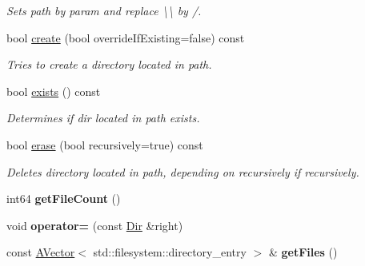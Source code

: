 \begin{DoxyCompactItemize}
\begin{DoxyCompactList}\small\item\em Sets path by param and replace \textbackslash{}\textbackslash{} by /. \end{DoxyCompactList}\item 
bool \mbox{\hyperlink{class_dir_a58485e06d15995822a108246d2b76b47}{create}} (bool override\+If\+Existing=false) const
\begin{DoxyCompactList}\small\item\em Tries to create a directory located in path. \end{DoxyCompactList}\item 
bool \mbox{\hyperlink{class_dir_ac6bf80b5b3a034e8c144c86ef48ae309}{exists}} () const
\begin{DoxyCompactList}\small\item\em Determines if dir located in path exists. \end{DoxyCompactList}\item 
bool \mbox{\hyperlink{class_dir_ac07ff8b32d21e0dbdfdedf4116b927eb}{erase}} (bool recursively=true) const
\begin{DoxyCompactList}\small\item\em Deletes directory located in path, depending on recursively if recursively. \end{DoxyCompactList}\item 
\mbox{\label{class_dir_a84d33695b8053ebd12359d2c74e34cb2}} 
int64 {\bfseries get\+File\+Count} ()
\item 
\mbox{\label{class_dir_ab57238d95749dfcd903beee73e6e6a9b}} 
void {\bfseries operator=} (const \mbox{\hyperlink{class_dir}{Dir}} \&right)
\item 
\mbox{\label{class_dir_ae573871f2f0ff5ec00ff20e7dc2ab709}} 
const \mbox{\hyperlink{class_a_vector}{A\+Vector}}$<$ std\+::filesystem\+::directory\+\_\+entry $>$ \& {\bfseries get\+Files} ()
\end{DoxyCompactItemize}
